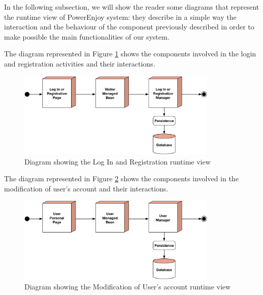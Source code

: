 In the following subsection, we will show the reader some diagrams that  represent the runtime view of PowerEnjoy system: they describe in a simple way the interaction and the behaviour of the component previously described in order to make possible the main functionalities of our system.

\newline
The diagram represented in Figure \ref{fig:login} shows the components involved in the login and registration activities and their interactions.

\begin{figure}[htbp]
\centering
\vspace{52pt}
\includegraphics[width=0.85\textwidth]{Images/LogInRun.pdf}
\vspace{10pt}
\caption{Diagram showing the Log In and Registration runtime view}
\label{fig:login}
\end{figure}
\clearpage

\newline
The diagram represented in Figure \ref{fig:modify} shows the components involved in the modification of user's account and their interactions.

\begin{figure}[htbp]
\centering
\vspace{104pt}
\includegraphics[width=0.85\textwidth]{Images/ModifyRun.pdf}
\vspace{10pt}
\caption{Diagram showing the Modification of User's account runtime view}
\label{fig:modify}
\end{figure}
\clearpage

